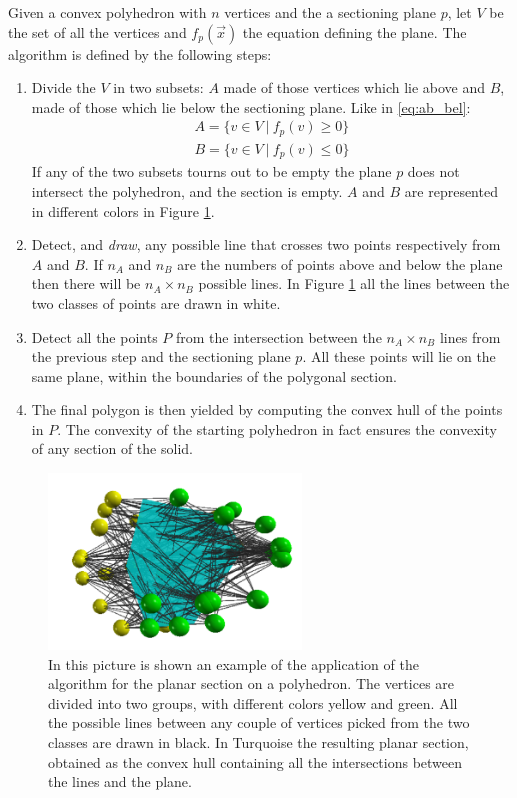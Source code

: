 Given a convex polyhedron with $n$ vertices and the a sectioning plane $p$, let $V$ be the set of all the vertices and $f_p(\vec x)$ the equation defining the plane. The algorithm is defined by the following steps:
\begin{enumerate}
    \item Divide the $V$ in two subsets: $A$ made of those vertices which lie above and $B$, made of those which lie below the sectioning plane. Like in \ref{eq:ab_bel}:
    \begin{align}
        A = \{ v \in V \ |\ f_p(v)\geq 0\} \label{eq:ab_bel} \\
        B = \{ v \in V \ |\ f_p(v)\leq 0\} \nonumber
    \end{align}
    If any of the two subsets tourns out to be empty the plane $p$ does not intersect the polyhedron, and the section is empty. $A$ and $B$ are represented in different colors in Figure \ref{fig:sec_pol}.

    \item Detect, and \textit{draw}, any possible line that crosses two points respectively from $A$ and $B$. If $n_A$ and $n_B$ are the numbers of points above and below the plane then there will be $n_A \times n_B$ possible lines. In Figure \ref{fig:sec_pol} all the lines between the two classes of points are drawn in white.

    \item Detect all the points $P$ from the intersection between the $n_A \times n_B$ lines from the previous step and the sectioning plane $p$. All these points will lie on the same plane, within the boundaries of the polygonal section.

    \item The final polygon is then yielded by computing the convex hull of the points in $P$. The convexity of the starting polyhedron in fact ensures the convexity of any section of the solid.
\end{enumerate}
\begin{figure}
    \centering
    \includegraphics[width = 0.6\textwidth]{images/sec_pol}
    \caption{In this picture is shown an example of the application of the algorithm for the planar section on a polyhedron. The vertices are divided into two groups, with different colors yellow and green. All the possible lines between any couple of vertices picked from the two classes are drawn in black. In Turquoise the resulting planar section, obtained as the convex hull containing all the intersections between the lines and the plane.}
    \label{fig:sec_pol}
\end{figure}

